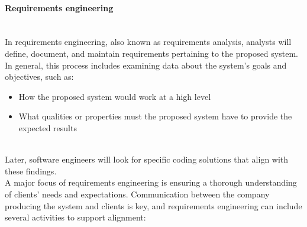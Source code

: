 \paragraph{Requirements engineering}\label{BRlCVYHhgjX3tesqzR_2k}
\\
In requirements engineering, also known as requirements analysis, analysts will define, document, and maintain requirements pertaining to the proposed system. In general, this process includes examining data about the system's goals and objectives, such as:

\begin{itemize}
\item
\protect{}\label{pSD86Y7xxahAGLqBHGWua}
How the proposed system would work at a high level
\item
\protect{}\label{Z1MGefSlGKSWRGC3C2I7v}
What qualities or properties must the proposed system have to provide the expected results
\end{itemize}
\\
Later, software engineers will look for specific coding solutions that align with these findings.
\\
A major focus of requirements engineering is ensuring a thorough understanding of clients' needs and expectations. Communication between the company producing the system and clients is key, and requirements engineering can include several activities to support alignment:

